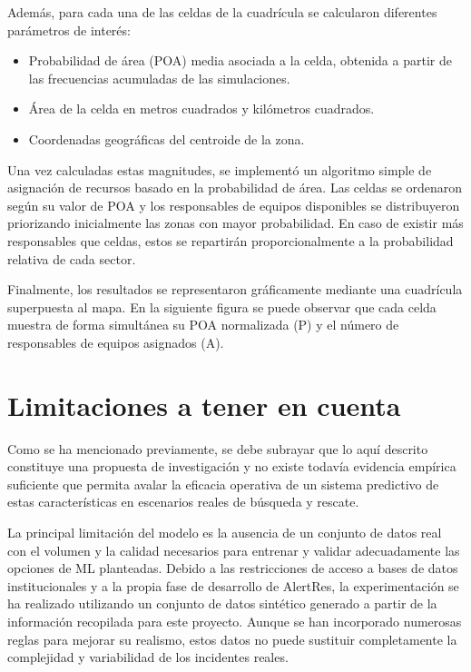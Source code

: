 Además, para cada una de las celdas de la cuadrícula se calcularon diferentes parámetros de interés:
\begin{itemize}
    \item Probabilidad de área (POA) media asociada a la celda, obtenida a partir de las frecuencias acumuladas de las simulaciones.
    \item Área de la celda en metros cuadrados y kilómetros cuadrados.
    \item Coordenadas geográficas del centroide de la zona.
\end{itemize}

Una vez calculadas estas magnitudes, se implementó un algoritmo simple de asignación de recursos basado en la probabilidad de área. Las celdas se ordenaron según su valor de POA y los responsables de equipos disponibles se distribuyeron priorizando inicialmente las zonas con mayor probabilidad. En caso de existir más responsables que celdas, estos se repartirán proporcionalmente a la probabilidad relativa de cada sector.

Finalmente, los resultados se representaron gráficamente mediante una cuadrícula superpuesta al mapa. En la siguiente figura se puede observar que cada celda muestra de forma simultánea su POA normalizada (P) y el número de responsables de equipos asignados (A).




\section{Limitaciones a tener en cuenta}

Como se ha mencionado previamente, se debe subrayar que lo aquí descrito constituye una propuesta de investigación y no existe todavía evidencia empírica suficiente que permita avalar la eficacia operativa de un sistema predictivo de estas características en escenarios reales de búsqueda y rescate.

La principal limitación del modelo es la ausencia de un conjunto de datos real con el volumen y la calidad necesarios para entrenar y validar adecuadamente las opciones de ML planteadas. Debido a las restricciones de acceso a bases de datos institucionales y a la propia fase de desarrollo de AlertRes, la experimentación se ha realizado utilizando un conjunto de datos sintético generado a partir de la información recopilada para este proyecto. Aunque se han incorporado numerosas reglas para mejorar su realismo, estos datos no puede sustituir completamente la complejidad y variabilidad de los incidentes reales.

